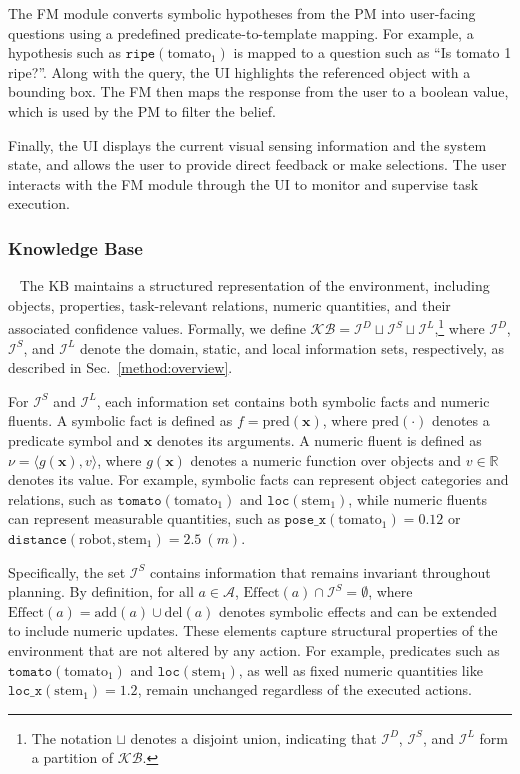 The FM module converts symbolic hypotheses from the PM into user-facing questions using a predefined predicate-to-template mapping. For example, a hypothesis such as $\texttt{ripe}(\text{tomato}_1)$ is mapped to a question such as ``Is tomato 1 ripe?''. Along with the query, the UI highlights the referenced object with a bounding box. The FM then maps the response from the user to a boolean value, which is used by the PM to filter the belief.

Finally, the UI displays the current visual sensing information and the system state, and allows the user to provide direct feedback or make selections. The user interacts with the FM module through the UI to monitor and supervise task execution.




\subsubsection{Knowledge Base}~\label{method:KB}
The KB maintains a structured representation of the environment, including objects, properties, task-relevant relations, numeric quantities, and their associated confidence values. Formally, we define $\mathcal{KB} = \mathcal{I}^{D} \sqcup \mathcal{I}^{S} \sqcup \mathcal{I}^{L}$,\footnote{The notation $\sqcup$ denotes a disjoint union, indicating that $\mathcal{I}^{D}$, $\mathcal{I}^{S}$, and $\mathcal{I}^{L}$ form a partition of $\mathcal{KB}$.} where $\mathcal{I}^{D}$, $\mathcal{I}^{S}$, and $\mathcal{I}^{L}$ denote the domain, static, and local information sets, respectively, as described in Sec.~\ref{method:overview}.

For $\mathcal{I}^{S}$ and $\mathcal{I}^{L}$, each information set contains both symbolic facts and numeric fluents. A symbolic fact is defined as $f = \text{pred}(\mathbf{x})$, where $\text{pred}(\cdot)$ denotes a predicate symbol and $\mathbf{x}$ denotes its arguments. A numeric fluent is defined as $\nu = \langle g(\mathbf{x}), v \rangle$, where $g(\mathbf{x})$ denotes a numeric function over objects and $v \in \mathbb{R}$ denotes its value. For example, symbolic facts can represent object categories and relations, such as $\texttt{tomato}(\text{tomato}_1)$ and $\texttt{loc}(\text{stem}_1)$, while numeric fluents can represent measurable quantities, such as $\texttt{pose\_x}(\text{tomato}_1)=0.12$ or $\texttt{distance}(\text{robot}, \text{stem}_1)=2.5\ (m)$.


Specifically, the set $\mathcal{I}^{S}$ contains information that remains invariant throughout planning. By definition, for all $a \in \mathcal{A}$, $\mathrm{Effect}(a) \cap \mathcal{I}^{S} = \emptyset$, where $\mathrm{Effect}(a)=\mathrm{add}(a) \cup \mathrm{del}(a)$ denotes symbolic effects and can be extended to include numeric updates. These elements capture structural properties of the environment that are not altered by any action. For example, predicates such as $\texttt{tomato}(\text{tomato}_1)$ and $\texttt{loc}(\text{stem}_1)$, as well as fixed numeric quantities like $\texttt{loc\_x}(\text{stem}_1)=1.2$, remain unchanged regardless of the executed actions.


